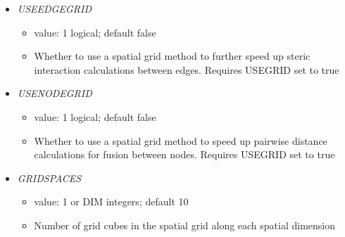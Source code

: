 \documentclass[12pt]{article}
\begin{document}
\begin{itemize}
\item {\it USEEDGEGRID}
\begin{itemize}
  \item  value: 1 logical; default false
  \item Whether to use a spatial grid method to further speed up steric interaction calculations between edges. Requires USEGRID set to true
\end{itemize}
%
\item {\it USENODEGRID}
  \begin{itemize}
    \item  value: 1 logical; default false
    \item Whether to use a spatial grid method to speed up pairwise distance calculations for fusion between nodes. Requires USEGRID set to true
  \end{itemize}
%
\item {\it GRIDSPACES}
  \begin{itemize}
    \item  value: 1 or DIM integers; default 10
    \item Number of grid cubes in the spatial grid along each spatial dimension
  \end{itemize}
\end{itemize}
\end{document}
